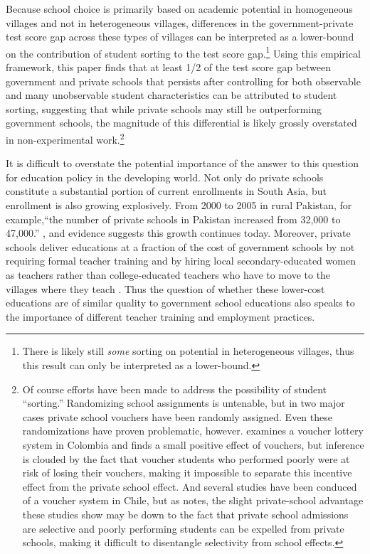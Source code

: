 \documentclass[Eubank_pk_ethnic_sorting.tex]{subfiles}
\begin{document}
Because school choice is primarily based on academic potential in homogeneous villages and not in heterogeneous villages, differences in the government-private test score gap across these types of villages can be interpreted as a lower-bound on the contribution of student sorting to the test score gap.\footnote{There is likely still \emph{some} sorting on potential in heterogeneous villages, thus this result can only be interpreted as a lower-bound.} Using this empirical framework, this paper finds that at least 1/2 of the test score gap between government and private schools that persists after controlling for both observable and many unobservable student characteristics can be attributed to student sorting, suggesting that while private schools may still be outperforming government schools, the magnitude of this differential is likely grossly overstated in non-experimental work.\footnote{Of course efforts have been made to address the possibility of student ``sorting.'' Randomizing school assignments is untenable, but in two major cases private school vouchers have been randomly assigned. Even these randomizations have proven problematic, however. \cite{Angrist:2002up} examines a voucher lottery system in Colombia and finds a small positive effect of vouchers, but inference is clouded by the fact that voucher students who performed poorly were at risk of losing their vouchers, making it impossible to separate this incentive effect from the private school effect. And several studies have been conduced of a voucher system in Chile, but as \cite{Bellei:2008uu} notes, the slight private-school advantage these studies show may be down to the fact that private school admissions are selective and poorly performing students can be expelled from private schools, making it difficult to disentangle selectivity from school effects.}

It is difficult to overstate the potential importance of the answer to this question for education policy in the developing world. Not only do private schools constitute a substantial portion of current enrollments in South Asia, but enrollment is also growing explosively. From 2000 to 2005 in rural Pakistan, for example,``the number of private schools in Pakistan increased from 32,000 to 47,000.'' \citep[p. vi]{Andrabi:2007we}, and evidence suggests this growth continues today. Moreover, private schools deliver educations at a fraction of the cost of government schools by not requiring formal teacher training and by hiring local secondary-educated women as teachers rather than college-educated teachers who have to move to the villages where they teach \citep{Andrabi:2007we}. Thus the question of whether these lower-cost educations are of similar quality to government school educations also speaks to the importance of different teacher training and employment practices.
\end{document}
